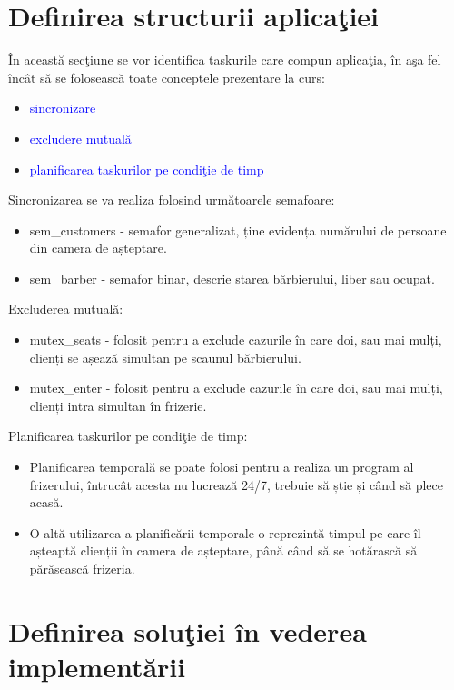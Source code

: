\documentclass[a4paper, 11pt]{article}
\begin{document}
\section{Definirea structurii aplica\c{t}iei}

\^{I}n aceast\u{a} sec\c{t}iune se vor identifica taskurile care compun aplica\c{t}ia, \^{i}n a\c{s}a fel \^{i}nc\^{a}t s\u{a} se foloseasc\u{a} toate conceptele prezentare la curs: 

\begin{itemize}
\item \textcolor{blue}{sincronizare}
\item \textcolor{blue}{excludere mutual\u{a}}
\item \textcolor{blue}{planificarea taskurilor pe condi\c{t}ie de timp}
\end{itemize}

Sincronizarea se va realiza folosind următoarele semafoare:
\begin{itemize}
\item sem\_customers - semafor generalizat, ține evidența numărului de persoane din camera de așteptare.
\item sem\_barber - semafor binar, descrie starea bărbierului, liber sau ocupat.
\end{itemize}

Excluderea mutuală:
\begin{itemize}
\item mutex\_seats   - folosit pentru a exclude cazurile în care doi, sau mai mulți, clienți se așează simultan pe scaunul bărbierului. 
\item mutex\_enter   - folosit pentru a exclude cazurile în care doi, sau mai mulți, clienți intra simultan în frizerie. 
\end{itemize}

Planificarea taskurilor pe condi\c{t}ie de timp:
\begin{itemize}
\item Planificarea temporală se poate folosi pentru a realiza un program al frizerului, întrucât acesta nu lucrează 24/7, trebuie să știe și când să plece acasă.
\item O altă utilizarea a planificării temporale o reprezintă timpul pe care îl așteaptă clienții în camera de așteptare, până când să se hotărască să părăsească frizeria.
\end{itemize}



\section{Definirea solu\c{t}iei \^{i}n vederea implement\u{a}rii}
\end{document}
